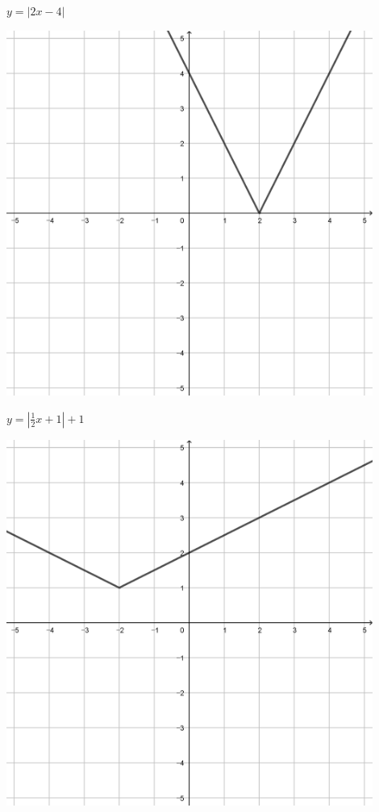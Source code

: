 \documentclass[a4paper]{oblivoir}
\begin{document}
\begin{minipage}{0.45\textwidth}\centering
\(y=|2x-4|\)
\par\bigskip\includegraphics[width=0.9\textwidth]{img/16-5}
\end{minipage}
\begin{minipage}{0.45\textwidth}\centering
\(y=|\frac12x+1|+1\)
\par\bigskip\includegraphics[width=0.9\textwidth]{img/16-6}
\end{minipage}\bigskip\bigskip\par
\end{document}
